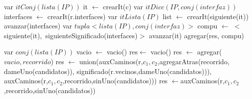 \begin{algorithm}\phantom{[H]}
\begin{algorithmic}[1]
  
  \State var $itConj(lista(IP))$ it $\gets$ crearIt(c)  
     
      \State var $itDicc(IP, conj(interfaz))$ interfaces $\gets$ crearIt(r.interfaces) 
      \State var $itLista(IP)$ list $\gets$ crearIt(siguiente(it)) 
       
      \State avanzar(interfaces)  
      \EndWhile
    \State var $tupla<lista(IP),conj(interfaz)>$ compu $\gets$ $<$siguiente(it),\ siguienteSignificado(interfaces)$>$ 
    \State avanzar(it)  
    \State agregar(res, compu)  
    \EndWhile  
\EndFunction
\end{algorithmic}
\end{algorithm}


\begin{algorithm}\phantom{[H]}
\begin{algorithmic}[1]
 
\State var $conj(lista(IP))$ vacio $\gets$ vacio()  
    
      \State res$\gets$ vacio() 
    \Else
         
        \State res $\gets$ agregar($vacio,recorrido$)  
      \Else
         
          \State res $\gets$ union\Bigg(auxCaminos\bigg(r,$c_{1},c_{2}$,agregarAtras(recorrido, \\
          \hspace*{6em}dameUno(candidatos)), significado(r.vecinos,dameUno(candidatos))\bigg), \\
          \hspace*{6em}auxCaminos\bigg(r,$c_{1},c_{2}$,recorrido,sinUno(candidatos)\bigg)\Bigg) 
        \Else
          \State res $\gets$auxCaminos(r,$c_{1}, c_{2}$,recorrido,sinUno(candidatos))  
        \EndIf
      \EndIf
  \EndIf      
\EndFunction
\end{algorithmic}
\end{algorithm}

